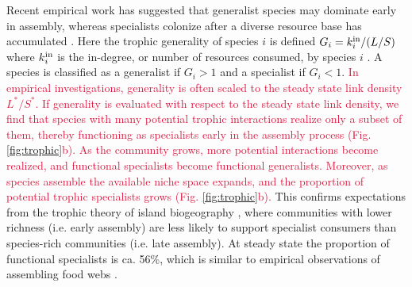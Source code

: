 \documentclass[twocolumn,preprintnumbers,amsmath,amssymb,superscriptaddress,linenumbers]{revtex4-1}
\newcommand{\rr}[1]{{\rm #1}}
\newcommand{\rev}[1]{\textcolor{crimson}{#1}}
\begin{document}
% 




Recent empirical work has suggested that generalist species may dominate early in assembly, whereas specialists colonize after a diverse resource base has accumulated \cite{Piechnik2008,Gravel2011}.
Here the trophic generality of species $i$ is defined $G_i = k^{\rm in}_i/(L/S)$ where $k^{\rm in}_i$ is the in-degree, or number of resources consumed, by species $i$ \cite{Williams2000}.
A species is classified as a generalist if $G_i > 1$ and a specialist if $G_i < 1$.
\rev{In empirical investigations, generality is often scaled to the steady state link density $L^*/S^*$.
If generality is evaluated with respect to the steady state link density, we find that species with many potential trophic interactions realize only a subset of them, thereby functioning as specialists early in the assembly process (Fig. \ref{fig:trophic}b).
As the community grows, more potential interactions become realized, and functional specialists become functional generalists.
Moreover, as species assemble the available niche space expands, and the proportion of potential trophic specialists grows (Fig. \ref{fig:trophic}b).}
This confirms expectations from the trophic theory of island biogeography \cite{Gravel2011}, where communities with lower richness (i.e. early assembly) are less likely to support specialist consumers than species-rich communities (i.e. late assembly).
At steady state the proportion of functional specialists is ca. 56\%, which is similar to empirical observations of assembling food webs \cite{Piechnik2008}.
\end{document}
